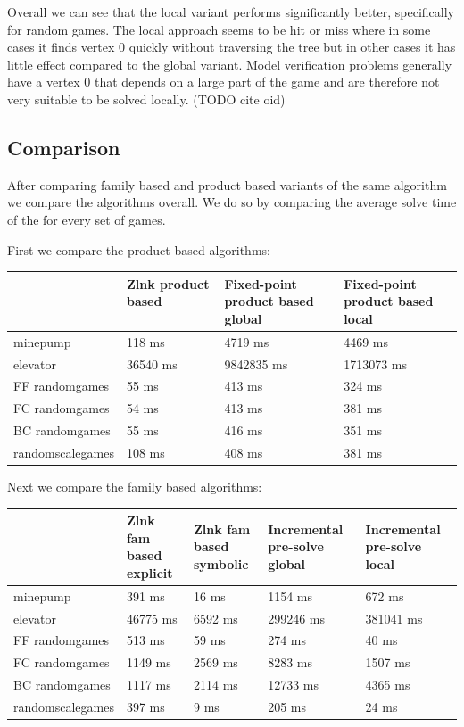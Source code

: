 Overall we can see that the local variant performs significantly better, specifically for random games. The local approach seems to be hit or miss where in some cases it finds vertex $0$ quickly without traversing the tree but in other cases it has little effect compared to the global variant. Model verification problems generally have a vertex $0$ that depends on a large part of the game and are therefore not very suitable to be solved locally. (TODO cite oid)

\subsection{Comparison}
After comparing family based and product based variants of the same algorithm we compare the algorithms overall. We do so by comparing the average solve time of the for every set of games.

First we compare the product based algorithms:\\
\begin{tabular}{|l|l|l|l|}
	\hline
	& \shortstack{Zlnk product based\\\ } & \shortstack{Fixed-point product based\\global} & \shortstack{Fixed-point product based\\local} \\ \hline
	minepump& 118 ms& 4719 ms& 4469 ms\\ \hline
	elevator& 36540 ms& 9842835 ms& 1713073 ms\\ \hline
	FF randomgames& 55 ms& 413 ms& 324 ms\\ \hline
	FC randomgames& 54 ms& 413 ms& 381 ms\\ \hline
	BC randomgames& 55 ms& 416 ms& 351 ms\\ \hline
	randomscalegames& 108 ms& 408 ms& 381 ms\\ \hline
\end{tabular}

Next we compare the family based algorithms:\\
\begin{tabular}{|l|l|l|l|l|}
	\hline
	& \shortstack{Zlnk fam based\\ explicit} & \shortstack{Zlnk fam based\\symbolic} & \shortstack{Incremental pre-solve\\global} & \shortstack{Incremental pre-solve\\local} \\ \hline
	minepump& 391 ms& 16 ms& 1154 ms& 672 ms\\ \hline
	elevator& 46775 ms& 6592 ms& 299246 ms& 381041 ms\\ \hline
	FF randomgames& 513 ms& 59 ms& 274 ms& 40 ms\\ \hline
	FC randomgames& 1149 ms& 2569 ms& 8283 ms& 1507 ms\\ \hline
	BC randomgames& 1117 ms& 2114 ms& 12733 ms& 4365 ms\\ \hline
	randomscalegames& 397 ms& 9 ms& 205 ms& 24 ms\\ \hline
\end{tabular}